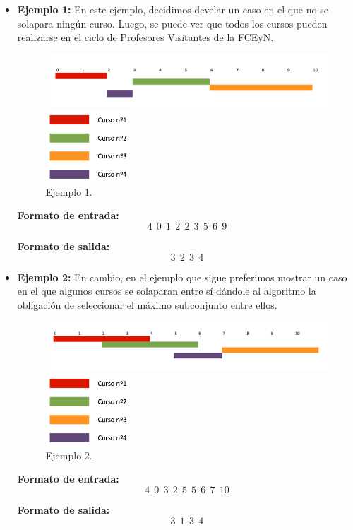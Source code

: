 \begin{itemize}
\item {\large{\textbf{Ejemplo 1:}}}\newline
En este ejemplo, decidimos develar un caso en el que no se solapara ningún curso. Luego, se puede ver que todos los cursos pueden realizarse en el ciclo de Profesores Visitantes de la FCEyN.
\begin{figure}[H] %
\begin{center}
\includegraphics[width=460pt]{../imgs/ejemplo1ej2.png}
\end{center}
\includegraphics[width=90pt]{../imgs/leyendaej2.png}
\caption{Ejemplo 1.}
\end{figure}

\textbf{Formato de entrada:} $$4\ \ 0\ \ 1\ \ 2\ \ 2\ \ 3\ \ 5\ \ 6\ \ 9$$

\textbf{Formato de salida:} $$3\ \ 2\ \ 3\ \ 4$$

\item {\large{\textbf{Ejemplo 2:}}}\newline
En cambio, en el ejemplo que sigue preferimos mostrar un caso en el que algunos cursos se solaparan entre sí dándole al algoritmo la obligación de seleccionar el máximo subconjunto entre ellos.

\begin{figure}[H] %
\begin{center}
\includegraphics[width=480pt]{../imgs/ejemplo2ej2.png}
\end{center}
\includegraphics[width=90pt]{../imgs/leyendaej2.png}
\caption{Ejemplo 2.}
\end{figure}

\textbf{Formato de entrada:} $$4\ \ 0\ \ 3\ \ 2\ \ 5\ \ 5\ \ 6\ \ 7\ \ 10$$

\textbf{Formato de salida:} $$3\ \ 1\ \ 3\ \ 4$$

\end{itemize}

